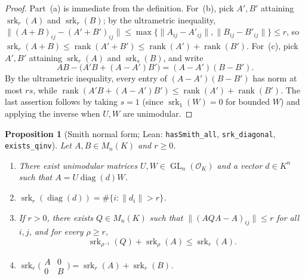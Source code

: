 \documentclass[11pt]{article}
\newtheorem{proposition}[theorem]{Proposition}
\theoremstyle{definition}
\theoremstyle{remark}
\numberwithin{equation}{section}
\DeclareMathOperator{\srk}{srk}
\DeclareMathOperator{\rank}{rank}
\DeclareMathOperator{\diag}{diag}
\DeclareMathOperator{\GL}{GL}
\newcommand{\OO}{\mathcal{O}}
\newcommand{\1}{\mathbf{1}}
\newcommand{\code}[1]{{\normalfont\small\texttt{#1}}}
\begin{document}
\begin{proof}
Part~(a) is immediate from the definition. For~(b), pick $A', B'$ attaining $\srk_r(A)$ and $\srk_r(B)$; by the ultrametric inequality, $\|(A+B)_{ij} - (A'+B')_{ij}\| \le \max\{\|A_{ij} - A'_{ij}\|, \|B_{ij} - B'_{ij}\|\} \le r$, so $\srk_r(A+B) \le \rank(A'+B') \le \rank(A') + \rank(B')$. For~(c), pick $A', B'$ attaining $\srk_r(A)$ and $\srk_s(B)$, and write
\[
AB - \bigl(A'B + (A - A')B'\bigr) = (A - A')(B - B').
\]
By the ultrametric inequality, every entry of $(A - A')(B - B')$ has norm at most $rs$, while $\rank(A'B + (A - A')B') \le \rank(A') + \rank(B')$. The last assertion follows by taking $s = 1$ (since $\srk_1(W) = 0$ for bounded $W$) and applying the inverse when $U, W$ are unimodular.
\end{proof}

\begin{proposition}[Smith normal form; Lean: \code{hasSmith\_all}, \code{srk\_diagonal}, \code{exists\_qinv}]
\label{prop:smith}
Let $A, B \in M_n(K)$ and $r \ge 0$.
\begin{enumerate}[label=\textup{(\alph*)},leftmargin=2.2em]
\item There exist unimodular matrices $U, W \in \GL_n(\OO_K)$ and a vector $d \in K^n$ such that $A = U \diag(d) W$.
\item $\srk_r(\diag(d)) = \#\{i : \|d_i\| > r\}$.
\item If $r > 0$, there exists $Q \in M_n(K)$ such that $\|(AQA - A)_{ij}\| \le r$ for all $i, j$, and for every $\rho \ge r$,
\[
\srk_{\rho^{-1}}(Q) + \srk_\rho(A) \le \srk_r(A).
\]
\item $\srk_r\bigl(\begin{smallmatrix} A & 0 \\ 0 & B \end{smallmatrix}\bigr) = \srk_r(A) + \srk_r(B)$.
\end{enumerate}
\end{proposition}
\end{document}
